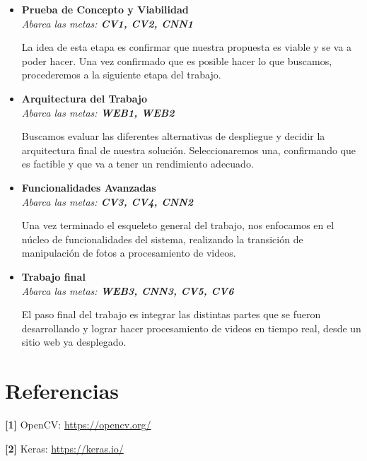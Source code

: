 \documentclass[a4paper]{article}
\begin{document}
\begin{itemize}
\item \textbf{Prueba de Concepto y Viabilidad}\\[0cm]
\hspace*{1mm}\emph{Abarca las metas: \textbf{CV1, CV2, CNN1}}

La idea de esta etapa es confirmar que nuestra propuesta es viable y se va a poder hacer. Una vez confirmado que es posible hacer lo que buscamos, procederemos a la siguiente etapa del trabajo.

\item \textbf{Arquitectura del Trabajo}\\[0cm]
\hspace*{1mm}\emph{Abarca las metas: \textbf{WEB1, WEB2}}

Buscamos evaluar las diferentes alternativas de despliegue y decidir la arquitectura final de nuestra solución.
Seleccionaremos una, confirmando que es factible y que va a tener un rendimiento adecuado.

\item \textbf{Funcionalidades Avanzadas}\\[0cm]
\hspace*{1mm}\emph{Abarca las metas: \textbf{CV3, CV4, CNN2}}

Una vez terminado el esqueleto general del trabajo, nos enfocamos en el núcleo de funcionalidades del sistema, realizando la transición de manipulación de fotos a procesamiento de videos.

\item \textbf{Trabajo final}\\[0cm]
\hspace*{1mm}\emph{Abarca las metas: \textbf{WEB3, CNN3, CV5, CV6}}

El paso final del trabajo es integrar las distintas partes que se fueron desarrollando y lograr hacer procesamiento de videos en tiempo real, desde un sitio web ya desplegado.

\end{itemize}

\setcounter{secnumdepth}{0}
\doublespacing

\section{Referencias}

\textbf{[1]} OpenCV: \url{https://opencv.org/}

\textbf{[2]} Keras: \url{https://keras.io/}
\end{document}

